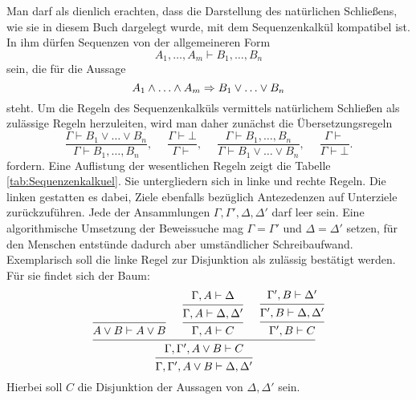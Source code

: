 Man darf als dienlich erachten, dass die Darstellung des natürlichen
Schließens, wie sie in diesem Buch dargelegt wurde, mit dem
Sequenzenkalkül kompatibel ist. In ihm dürfen Sequenzen von der
allgemeineren Form
\[A_1,\ldots,A_m\vdash B_1,\ldots,B_n\]
sein, die für die Aussage
\[A_1\land\ldots\land A_m\Rightarrow B_1\lor\ldots\lor B_n\]
steht. Um die Regeln des Sequenzenkalküls vermittels natürlichem Schließen
als zulässige Regeln herzuleiten, wird man daher zunächst die
Übersetzungsregeln
\[\dfrac{\Gamma\vdash B_1\lor\ldots\lor B_n}{\Gamma\vdash B_1,\ldots,B_n},\quad\;
\dfrac{\Gamma\vdash\bot}{\Gamma\vdash},\quad\;
\dfrac{\Gamma\vdash B_1,\ldots,B_n}{\Gamma\vdash B_1\lor\ldots\lor B_n},\quad\;
\dfrac{\Gamma\vdash}{\Gamma\vdash\bot}.\]
fordern. Eine Auflistung der wesentlichen Regeln zeigt die Tabelle
\ref{tab:Sequenzenkalkuel}. Sie untergliedern sich in linke und rechte
Regeln. Die linken gestatten es dabei, Ziele ebenfalls bezüglich
Antezedenzen auf Unterziele zurückzuführen. Jede der Ansammlungen
$\Gamma,\Gamma',\Delta,\Delta'$ darf leer sein. Eine algorithmische
Umsetzung der Beweissuche mag $\Gamma=\Gamma'$ und $\Delta=\Delta'$
setzen, für den Menschen entstünde dadurch aber umständlicher
Schreibaufwand. Exemplarisch soll die linke Regel zur Disjunktion als
zulässig bestätigt werden. Für sie findet sich der Baum:
\[
\begin{prooftree}
    \infer0{A\lor B\vdash A\lor B}
        \hypo{\Gamma,A\vdash\Delta}
      \infer1{\Gamma,A\vdash\Delta,\Delta'}
    \infer1{\Gamma,A\vdash C}
        \hypo{\Gamma',B\vdash\Delta'}
      \infer1{\Gamma',B\vdash\Delta,\Delta'}
    \infer1{\Gamma',B\vdash C}
  \infer3{\Gamma,\Gamma',A\lor B\vdash C}
\infer1{\Gamma,\Gamma',A\lor B\vdash \Delta,\Delta'}
\end{prooftree}
\]
Hierbei soll $C$ die Disjunktion der Aussagen von $\Delta,\Delta'$ sein.

